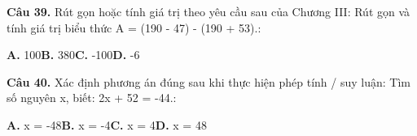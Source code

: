 \documentclass[11pt,a4paper]{article}
\begin{document}
\textbf{\color{primary} Câu 39.} Rút gọn hoặc tính giá trị theo yêu cầu sau của Chương III: Rút gọn và tính giá trị biểu thức A = (190 - 47) - (190 + 53).:\par
\hspace*{1.5em}\textbf{A.} 100\quad\quad \textbf{B.} 380\quad\quad \textbf{C.} -100\quad\quad \textbf{D.} -6\par\vspace{2pt}
\textbf{\color{primary} Câu 40.} Xác định phương án đúng sau khi thực hiện phép tính / suy luận: Tìm số nguyên x, biết: 2x + 52 = -44.:\par
\hspace*{1.5em}\textbf{A.} x = -48\quad\quad \textbf{B.} x = -4\quad\quad \textbf{C.} x = 4\quad\quad \textbf{D.} x = 48\par\vspace{2pt}
\end{document}
